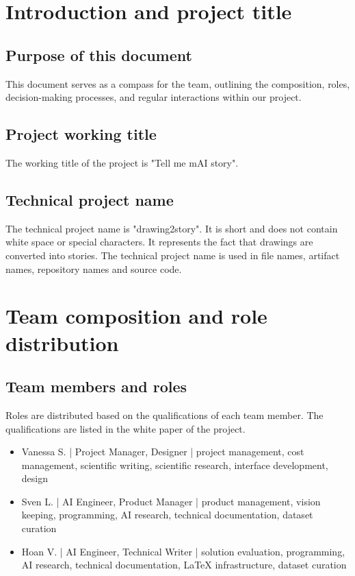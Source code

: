 \section{Introduction and project title}
\subsection{Purpose of this document}
This document serves as a compass for the team, outlining the composition, roles, decision-making processes, and regular interactions within our project.
\subsection{Project working title}
The working title of the project is "Tell me mAI story".
\subsection{Technical project name}
The technical project name is "drawing2story".
It is short and does not contain white space or special characters.
It represents the fact that drawings are converted into stories.
The technical project name is used in file names, artifact names, repository names and source code.

\section{Team composition and role distribution}
\subsection{Team members and roles}
Roles are distributed based on the qualifications of each team member.
The qualifications are listed in the white paper of the project.
\begin{itemize}
    \item Vanessa S. | Project Manager, Designer | project management, cost management, scientific writing, scientific research, interface development, design
    \item Sven L. | AI Engineer, Product Manager | product management, vision keeping, programming, AI research, technical documentation, dataset curation
    \item Hoan V. | AI Engineer, Technical Writer | solution evaluation, programming, AI research, technical documentation, LaTeX infrastructure, dataset curation
\end{itemize}
